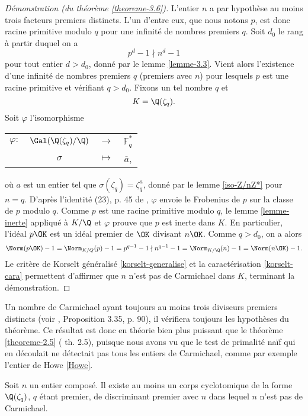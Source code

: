 \begin{proof}[Démonstration (du théorème \ref{theoreme-3.6})]
	L'entier $n$ a par hypothèse au moins trois facteurs premiers distincts. L'un d'entre eux, que nous notons $p$, est donc racine primitive modulo $q$ pour une infinité de nombres premiers $q$. Soit $d_0$ le rang à partir duquel on a \[p^d - 1 \nmid n^d - 1\] pour tout entier $d>d_0$, donné par le lemme \ref{lemme-3.3}. Vient alors l'existence d'une infinité de nombres premiers $q$ (premiers avec $n$) pour lesquels $p$ est une racine primitive et vérifiant $q>d_0$. Fixons un tel nombre $q$ et \[K = \Q(\zeta_q).\] Soit $\varphi$ l'isomorphisme
\begin{center}
	\begin{tabular}{cccc}
		$\varphi :$ & $\Gal(\Q(\zeta_q)/\Q)$ & $\longrightarrow$ & $\mathbb{F}_q^*$ \\
		&$\sigma$	& $\longmapsto$ & $\overline{a}$,
	\end{tabular}
\end{center}
où $a$ est un entier tel que $\sigma(\zeta_q) = \zeta_q^a$, donné par le lemme \ref{iso-Z/nZ*} pour $n=q$. D'après l'identité (23), p. 45 de \cite{Kraus}, $\varphi$ envoie le Frobenius de $p$ sur la classe de $p$ modulo $q$. Comme $p$ est une racine primitive modulo $q$, le lemme \ref{lemme-inerte} appliqué à $K/\Q$ et $\varphi$ prouve que $p$ est inerte dans $K$. En particulier, l'idéal $p\OK$ est un idéal premier de $\OK$ divisant $n\OK$. Comme $q>d_0$, on a alors \[ \Norm(p\OK) - 1 = \Norm_{K/Q}(p) - 1 = p^{q-1} - 1 \nmid n^{q-1} - 1 = \Norm_{K/\Q}(n) - 1 = \Norm(n\OK) - 1.\] Le critère de Korselt généralisé \ref{korselt-generalise} et la caractérisation \ref{korselt-cara} permettent d'affirmer que $n$ n'est pas de Carmichael dans $K$, terminant la démonstration.

\end{proof}

Un nombre de Carmichael ayant toujours au moins trois diviseurs premiers distincts (voir \cite{Demazure}, Proposition 3.35, p. 90), il vérifiera toujours les hypothèses du théorème. Ce résultat est donc en théorie bien plus puissant que le théorème \ref{theoreme-2.5} (\cite{article} th. 2.5), puisque nous avons vu que le test de primalité naïf qui en découlait ne détectait pas tous les entiers de Carmichael, comme par exemple l'entier de Howe \ref{Howe}. 

\begin{corollaire}\label{corollaire-3.7}
	Soit $n$ un entier composé. Il existe au moins un corps cyclotomique de la forme $\Q(\zeta_q)$, $q$ étant premier, de discriminant premier avec $n$ dans lequel $n$ n'est pas de Carmichael.
\end{corollaire}

